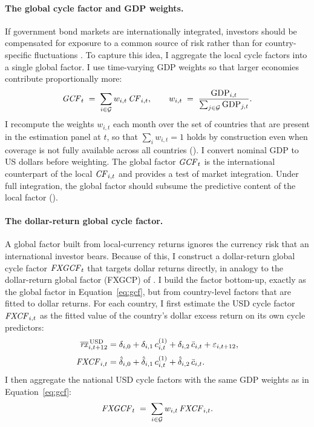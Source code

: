 \paragraph{The global cycle factor and GDP weights.}
If government bond markets are internationally integrated, investors should be
compensated for exposure to a common source of risk rather than for
country-specific fluctuations \citep{dahlquist2013}. To capture this idea, I
aggregate the local cycle factors into a single global factor. I use
time-varying GDP weights so that larger economies contribute proportionally
more:
\begin{equation}
  \mathit{GCF}_{t} \;=\; \sum_{i\in\mathcal{G}} w_{i,t}\,\mathit{CF}_{i,t},
  \qquad
  w_{i,t} \;=\; \frac{\mathrm{GDP}_{i,t}}
                     {\sum_{j\in\mathcal{G}}\mathrm{GDP}_{j,t}}.
  \label{eq:gcf}
\end{equation}
I recompute the weights $w_{i,t}$ each month over the set of countries that
are present in the estimation panel at $t$, so that $\sum_{i}w_{i,t}=1$ holds
by construction even when coverage is not fully available across all countries
(). I convert nominal GDP to US dollars before
weighting. The global
factor $\mathit{GCF}_{t}$ is the international counterpart of the local $\mathit{CF}_{i,t}$ and
provides a test of market integration. Under full integration,
the global factor should subsume the predictive content of the local factor
().

\paragraph{The dollar-return global cycle factor.}
\label{sec:fw-fxgcf}
A global factor built from local-currency returns ignores the currency risk
that an international investor bears. Because of this, I construct a
dollar-return global cycle factor $\mathit{FXGCF}_{t}$ that targets dollar
returns directly, in analogy to the dollar-return global factor (FXGCP) of
\citet{dahlquist2013}. I build the factor bottom-up, exactly as the global
factor in Equation~\eqref{eq:gcf}, but from country-level factors that are fitted to
dollar returns. For each country, I first estimate the USD cycle
factor $\mathit{FXCF}_{i,t}$ as the fitted value of the country's dollar excess
return on its own cycle predictors:
\begin{align}
  \overline{\mathit{rx}}^{\,\mathrm{USD}}_{i,t+12}
     &= \delta_{i,0} + \delta_{i,1}\,c^{(1)}_{i,t}
        + \delta_{i,2}\,\bar{c}_{i,t} + \varepsilon_{i,t+12},
        \label{eq:fxcf-reg}\\[2pt]
  \mathit{FXCF}_{i,t} &= \hat\delta_{i,0} + \hat\delta_{i,1}\,c^{(1)}_{i,t}
              + \hat\delta_{i,2}\,\bar{c}_{i,t}.
        \label{eq:fxcf}
\end{align}
I then aggregate the national USD cycle factors with the same GDP weights as
in Equation~\eqref{eq:gcf}:
\begin{equation}
  \mathit{FXGCF}_{t} \;=\; \sum_{i\in\mathcal{G}} w_{i,t}\,\mathit{FXCF}_{i,t}.
  \label{eq:fxgcf}
\end{equation}

